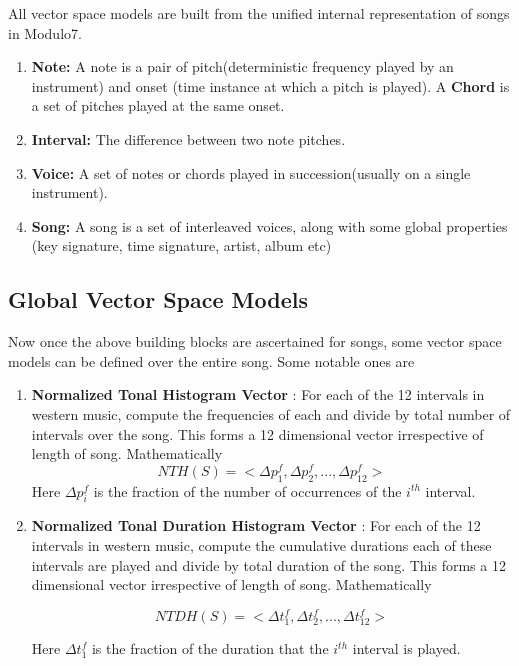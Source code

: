 \documentclass{article}
\begin{document}
All vector space models are built from the unified internal representation of songs in Modulo7. 

\begin{enumerate}
\item \textbf{Note:} A note is a pair of pitch(deterministic frequency played by an instrument) and onset (time instance at which a pitch is played). A \textbf{Chord} is a set of pitches played at the same onset. 
\item \textbf{Interval:} The difference between two note pitches.
\item \textbf{Voice:} A set of notes or chords played in succession(usually on a single instrument).
\item \textbf{Song: } A song is a set of interleaved voices, along with some global properties (key signature, time signature, artist, album etc)
\end{enumerate}

\subsection{Global Vector Space Models} \label{globalvectorspace}

Now once the above building blocks are ascertained for songs, some vector space models can be defined over the entire song. Some notable ones are 

\begin{enumerate}
\item \textbf{Normalized Tonal Histogram Vector} : For each of the 12 intervals in western music, compute the frequencies of each and divide by total number of intervals over the song. This forms a 12 dimensional vector irrespective of length of song. Mathematically
\begin{equation}
NTH(S) = <\Delta p^f_1, \Delta p^f_2, ... , \Delta p^f_{12}>
\end{equation}
Here $\Delta p^f_i$ is the fraction of the number of occurrences of the $i^{th}$ interval.
\item \textbf{Normalized Tonal Duration Histogram Vector} : For each of the 12 intervals in western music, compute the cumulative durations each of these intervals are played and divide by total duration of the song. This forms a 12 dimensional vector irrespective of length of song. Mathematically 

\begin{equation}
NTDH(S) = <\Delta t^f_1, \Delta t^f_2, ... , \Delta t^f_{12}>
\end{equation}

Here $\Delta t^f_1$ is the fraction of the duration that the  $i^{th}$ interval is played.  
 
\end{enumerate}
\end{document}
